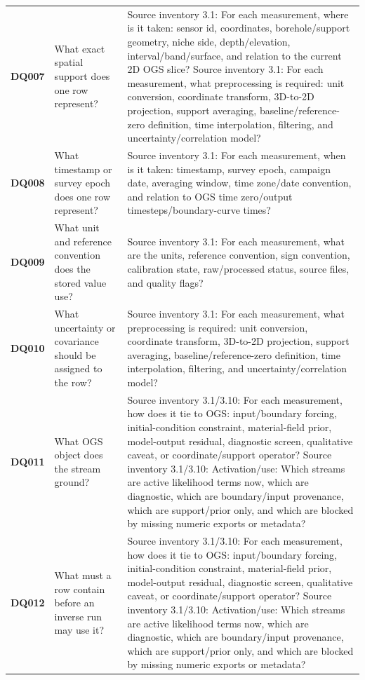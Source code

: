 \begin{longtable}{@{}L{0.09\textwidth} L{0.31\textwidth} L{0.52\textwidth}@{}}
\addlinespace[0.18em]
\textbf{DQ007} & What exact spatial support does one row represent? & Source inventory 3.1: For each measurement, where is it taken: sensor id, coordinates, borehole/support geometry, niche side, depth/elevation, interval/band/surface, and relation to the current 2D OGS slice? Source inventory 3.1: For each measurement, what preprocessing is required: unit conversion, coordinate transform, 3D-to-2D projection, support averaging, baseline/reference-zero definition, time interpolation, filtering, and uncertainty/correlation model?\\
\addlinespace[0.18em]
\textbf{DQ008} & What timestamp or survey epoch does one row represent? & Source inventory 3.1: For each measurement, when is it taken: timestamp, survey epoch, campaign date, averaging window, time zone/date convention, and relation to OGS time zero/output timesteps/boundary-curve times?\\
\addlinespace[0.18em]
\textbf{DQ009} & What unit and reference convention does the stored value use? & Source inventory 3.1: For each measurement, what are the units, reference convention, sign convention, calibration state, raw/processed status, source files, and quality flags?\\
\addlinespace[0.18em]
\textbf{DQ010} & What uncertainty or covariance should be assigned to the row? & Source inventory 3.1: For each measurement, what preprocessing is required: unit conversion, coordinate transform, 3D-to-2D projection, support averaging, baseline/reference-zero definition, time interpolation, filtering, and uncertainty/correlation model?\\
\addlinespace[0.18em]
\textbf{DQ011} & What OGS object does the stream ground? & Source inventory 3.1/3.10: For each measurement, how does it tie to OGS: input/boundary forcing, initial-condition constraint, material-field prior, model-output residual, diagnostic screen, qualitative caveat, or coordinate/support operator? Source inventory 3.1/3.10: Activation/use: Which streams are active likelihood terms now, which are diagnostic, which are boundary/input provenance, which are support/prior only, and which are blocked by missing numeric exports or metadata?\\
\addlinespace[0.18em]
\textbf{DQ012} & What must a row contain before an inverse run may use it? & Source inventory 3.1/3.10: For each measurement, how does it tie to OGS: input/boundary forcing, initial-condition constraint, material-field prior, model-output residual, diagnostic screen, qualitative caveat, or coordinate/support operator? Source inventory 3.1/3.10: Activation/use: Which streams are active likelihood terms now, which are diagnostic, which are boundary/input provenance, which are support/prior only, and which are blocked by missing numeric exports or metadata?\\

\end{longtable}
